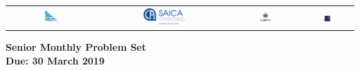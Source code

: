 \documentclass{article}
\begin{document}
\setlength{\tabcolsep}{0.015\textwidth}
\begin{center} \begin{tabular}{cccc}
	\includegraphics[width=0.16\textwidth]{SAMF_logo.jpg} &
	\includegraphics[width=0.35\textwidth]{SAICA_logo.jpg} &
	\includegraphics[width=0.18\textwidth]{Liberty_logo.jpg} &
	\includegraphics[width=0.18\textwidth]{SAMO2019.png}
\end{tabular} \end{center}


\vspace{30pt}

\begin{center}
\textbf{\Large Senior Monthly Problem Set}
\\ \vspace{1em}
\textbf{\large Due: 30 March 2019}
\end{center}
\end{document}
